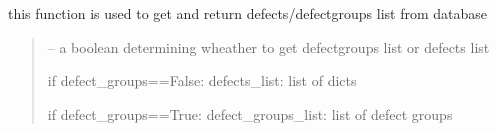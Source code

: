 \documentclass[letterpaper,10pt,english]{sphinxmanual}
\begin{document}
\begin{savenotes}\begin{fulllineitems}
\label{\detokenize{setting/backend/defect_management_funcs:oxin.backend.defect_management_funcs.get_defects_from_db}}
\pysigstartsignatures
{}
\pysigstopsignatures
\sphinxAtStartPar
this function is used to get and return defects/defect\sphinxhyphen{}groups list from database
\begin{quote}\begin{description}
\sphinxAtStartPar
{} – a boolean determining wheather to get defect\sphinxhyphen{}groups list or defects list

\sphinxAtStartPar
if defect\_groups==False:
defects\_list: list of dicts

\sphinxAtStartPar
if defect\_groups==True:
defect\_groups\_list: list of defect groups

\end{description}\end{quote}

\end{fulllineitems}\end{savenotes}

\end{document}
